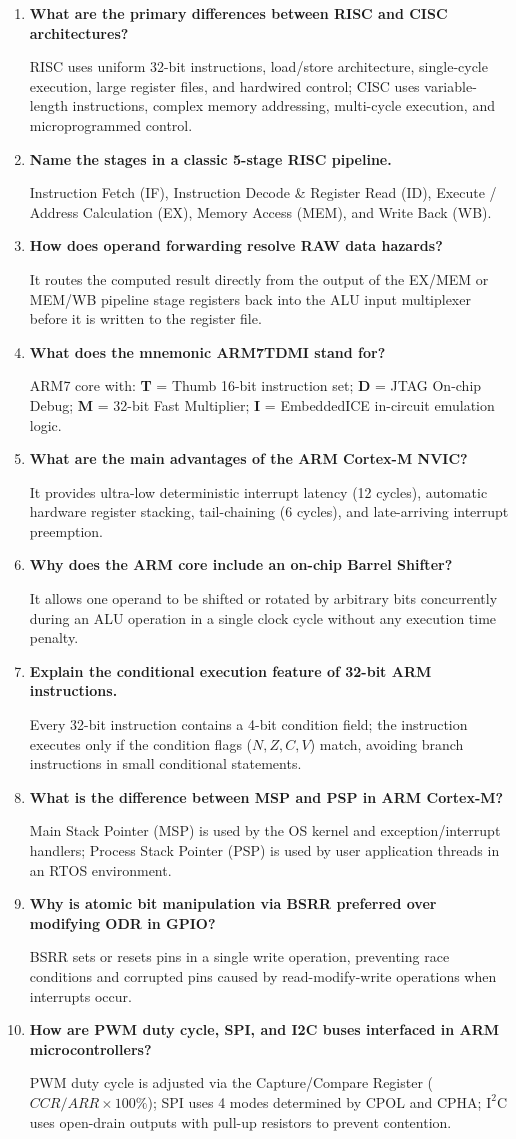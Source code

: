 \documentclass[12pt,a4paper]{article}
\newcommand{\Q}[1]{\textbf{#1}\par\noindent\ignorespaces}
\begin{document}
\begin{tcolorbox}[exambox, title={Frequently Asked / Viva Questions}]
\begin{enumerate}[leftmargin=*, label=\textbf{Q\arabic*.}, itemsep=2.5pt]
  \item \Q{What are the primary differences between RISC and CISC architectures?}
  RISC uses uniform 32-bit instructions, load/store architecture, single-cycle execution, large register files, and hardwired control; CISC uses variable-length instructions, complex memory addressing, multi-cycle execution, and microprogrammed control.
  \item \Q{Name the stages in a classic 5-stage RISC pipeline.}
  Instruction Fetch (IF), Instruction Decode \& Register Read (ID), Execute / Address Calculation (EX), Memory Access (MEM), and Write Back (WB).
  \item \Q{How does operand forwarding resolve RAW data hazards?}
  It routes the computed result directly from the output of the EX/MEM or MEM/WB pipeline stage registers back into the ALU input multiplexer before it is written to the register file.
  \item \Q{What does the mnemonic ARM7TDMI stand for?}
  ARM7 core with: \textbf{T} = Thumb 16-bit instruction set; \textbf{D} = JTAG On-chip Debug; \textbf{M} = 32-bit Fast Multiplier; \textbf{I} = EmbeddedICE in-circuit emulation logic.
  \item \Q{What are the main advantages of the ARM Cortex-M NVIC?}
  It provides ultra-low deterministic interrupt latency (12 cycles), automatic hardware register stacking, tail-chaining (6 cycles), and late-arriving interrupt preemption.
  \item \Q{Why does the ARM core include an on-chip Barrel Shifter?}
  It allows one operand to be shifted or rotated by arbitrary bits concurrently during an ALU operation in a single clock cycle without any execution time penalty.
  \item \Q{Explain the conditional execution feature of 32-bit ARM instructions.}
  Every 32-bit instruction contains a 4-bit condition field; the instruction executes only if the condition flags ($N, Z, C, V$) match, avoiding branch instructions in small conditional statements.
  \item \Q{What is the difference between MSP and PSP in ARM Cortex-M?}
  Main Stack Pointer (MSP) is used by the OS kernel and exception/interrupt handlers; Process Stack Pointer (PSP) is used by user application threads in an RTOS environment.
  \item \Q{Why is atomic bit manipulation via BSRR preferred over modifying ODR in GPIO?}
  BSRR sets or resets pins in a single write operation, preventing race conditions and corrupted pins caused by read-modify-write operations when interrupts occur.
  \item \Q{How are PWM duty cycle, SPI, and I2C buses interfaced in ARM microcontrollers?}
  PWM duty cycle is adjusted via the Capture/Compare Register ($CCR/ARR \times 100\%$); SPI uses 4 modes determined by $\mathrm{CPOL}$ and $\mathrm{CPHA}$; $\mathrm{I^2C}$ uses open-drain outputs with pull-up resistors to prevent contention.
\end{enumerate}
\end{tcolorbox}
\end{document}
